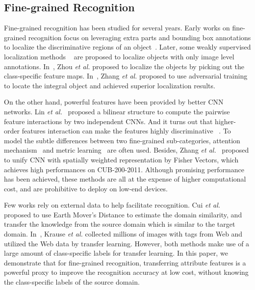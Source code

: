 \documentclass[runningheads]{llncs}
\begin{document}
\subsection{Fine-grained Recognition}
\noindent Fine-grained recognition has been studied for several years. Early works on fine-grained recognition focus on leveraging extra parts and bounding box annotations to localize the discriminative regions of an object~\cite{branson2014bird,zhang2014part,zhang2015fine,lin2015deep}.
Later, some weakly supervised localization methods ~\cite{bency2016weakly,singh2017hide,kim2017two,oquab2015object,zhou2016learning,selvaraju2017grad,zhang2018adversarial} are proposed to localize objects with only image level annotations.  In~\cite{zhou2016learning}, Zhou \textit{et al.} proposed to localize the objects by picking out the class-specific feature maps. In~\cite{zhang2018adversarial}, Zhang \textit{et al.} proposed to use adversarial training to locate the integral object and achieved superior localization results.

On the other hand, powerful features have been provided by better CNN networks.  Lin \textit{et al.}~\cite{lin2015bilinear} proposed a bilinear structure to compute the pairwise feature interactions by two independent CNNs. And it turns out that higher-order features interaction can make the features highly discriminative ~\cite{cui2017kernel}. To model the subtle differences between two fine-grained sub-categories, attention mechanism~\cite{xiao2015application,zheng2017learning,fu2017look} and metric learning~\cite{schroff2015facenet,cui2016fine} are often used.  Besides, Zhang \textit{et al.}~\cite{zhang2016picking} proposed to unify CNN with spatially weighted representation by Fisher Vectors, which achieves high performances on CUB-200-2011. Although promising performance has been achieved, these methods are all at the expense of higher computational cost, and are prohibitive to deploy on low-end devices.

Few works rely on external data to help facilitate recognition. Cui \textit{et al.}~\cite{cui2018large} proposed to use Earth Mover's Distance to estimate the domain similarity, and transfer the knowledge from the source domain which is similar to the target domain. In~\cite{krause2016unreasonable}, Krause \textit{et al.} collected millions of images with tags from Web and utilized the Web data by transfer learning. However, both methods make use of a large amount of class-specific labels for transfer learning. In this paper, we demonstrate that for fine-grained recognition, transferring attribute features is a powerful proxy to improve the recognition accuracy at low cost, without knowing the class-specific labels of the source domain.
\end{document}
